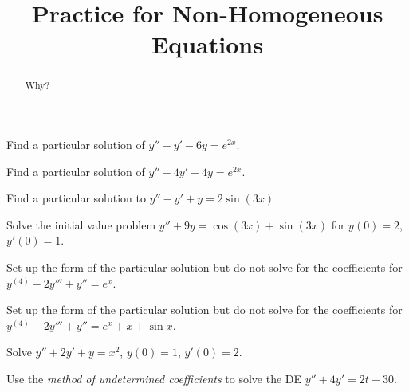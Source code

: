\documentclass{ximera}
\title{Practice for Non-Homogeneous Equations}
\begin{document}
\begin{abstract}
    Why?
\end{abstract}
\maketitle

 
\begin{exercise}
    Find a particular solution of $y''-y' -6y = e^{2x}$.
\end{exercise}

\begin{exercise}
    Find a particular solution of $y''-4y' +4y = e^{2x}$.
\end{exercise}

\begin{exercise}%
    Find a particular solution to $y''-y'+y=2\sin(3x)$
\end{exercise}

\begin{exercise}
    Solve the initial value problem $y''+9y = \cos (3x) + \sin (3x)$ for $y(0) = 2$, $y'(0) = 1$.
\end{exercise}

\begin{exercise}
    Set up the form of the particular solution but do not solve for the coefficients for $y^{(4)}-2y'''+y'' = e^x$.
\end{exercise}

\begin{exercise}
    Set up the form of the particular solution but do not solve for the coefficients for $y^{(4)}-2y'''+y'' = e^x + x + \sin x$.
\end{exercise}

\begin{exercise}%
    Solve $y''+2y'+y = x^2$, $y(0)=1$, $y'(0)=2$.
\end{exercise}

\begin{exercise}
    Use the {\it method of undetermined coefficients} to solve the DE $y''+4y'=2t+30$. %
\end{exercise}
\end{document}
